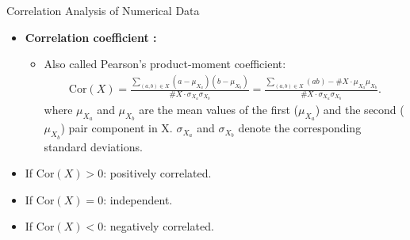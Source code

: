 \begin{frame}{Correlation Analysis of Numerical Data}
	\begin{itemize}
		\item \textbf{\color{airforceblue}Correlation coefficient :}
		\begin{itemize}
			\item Also called Pearson's product-moment coefficient:
			\begin{align}
				\text{Cor}({X}) = \frac{\sum_{(a, b) \in X} 
				(a-\mu_{X_a})(b-\mu_{X_b})}{\#X\cdot\sigma_{X_a}\sigma_{X_b}} = 
				\frac{\sum_{(a, b) \in X}(a 
				b)-\#X\cdot\mu_{X_a}\mu_{X_b}}{\#X\cdot
				\sigma_{X_a}\sigma_{X_b}}. 
			\end{align}
			where $\mu_{X_a}$ and $\mu_{X_b}$ are the mean values 
			of the first ($\mu_{X_a}$) and the second ($\mu_{X_b}$) pair 
			component in X. $\sigma_{X_a}$ and $\sigma_{X_b}$ 
			denote the corresponding standard deviations.
		\end{itemize}
		\item If $\text{Cor}({X}) > 0$: positively correlated.
		\item If $\text{Cor}({X}) = 0$: independent.
		\item If $\text{Cor}({X}) < 0$: negatively correlated.
	\end{itemize}
\end{frame}

